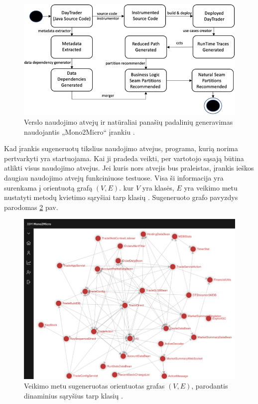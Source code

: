\documentclass{VUMIFPSbakalaurinis}
\begin{document}
\begin{figure}[H]
    \centering
    \includegraphics{img/mono-2-micro-veikimas.png}
    \caption{Verslo naudojimo atvejų ir natūraliai panašių padalinių generavimas naudojantis „Mono2Micro“ įrankiu \cite{KXL+20}.}
    \label{img:mono-2-micro}
\end{figure}

Kad įrankis sugeneruotų tikslius naudojimo atvejus, programa, kurią norima pertvarkyti yra startuojama. Kai ji pradeda veikti, per vartotojo sąsają būtina atlikti visus naudojimo atvejus. Jei kuris nors atvejis bus praleistas, įrankis ieškos daugiau naudojimo atvejų funkciniuose testuose. Visa ši informacija yra surenkama į orientuotą grafą $(V, E)$. kur $V$ yra klasės, $E$ yra veikimo metu nustatyti metodų kvietimo sąryšiai tarp klasių \cite{KXL+20}. Sugeneruoto grafo pavyzdys parodomas \ref{img:mono-micro-grafas} pav.

\begin{figure}[H]
    \centering
    \includegraphics{img/mono-micro-grafas.png}
    \caption{Veikimo metu sugeneruotas orientuotas grafas $(V, E)$, parodantis dinaminius sąryšius tarp klasių \cite{KXL+20}.}
    \label{img:mono-micro-grafas}
\end{figure}
\end{document}
